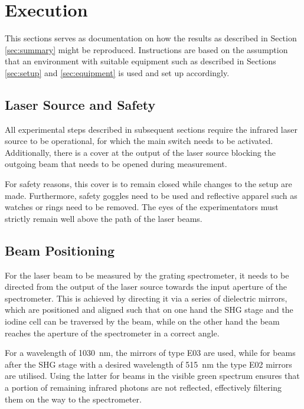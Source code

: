 \section{Execution}
\label{sec:execution}

This sections serves as documentation on how the results as described in Section \ref{sec:summary} might be reproduced. Instructions are based on the assumption that an environment with suitable equipment such as described in Sections \ref{sec:setup} and \ref{sec:equipment} is used and set up accordingly.

\subsection{Laser Source and Safety}
\label{sec:laser-source-and-safety}

All experimental steps described in subsequent sections require the infrared laser source to be operational, for which the main switch needs to be activated. Additionally, there is a cover at the output of the laser source blocking the outgoing beam that needs to be opened during measurement.

For safety reasons, this cover is to remain closed while changes to the setup are made. Furthermore, safety goggles need to be used and reflective apparel such as watches or rings need to be removed. The eyes of the experimentators must strictly remain well above the path of the laser beams.

\subsection{Beam Positioning}
\label{sec:execution:beam-positioning}

For the laser beam to be measured by the grating spectrometer, it needs to be directed from the output of the laser source towards the input aperture of the spectrometer. This is achieved by directing it via a series of dielectric mirrors, which are positioned and aligned such that on one hand the SHG stage and the iodine cell can be traversed by the beam, while on the other hand the beam reaches the aperture of the spectrometer in a correct angle.

For a wavelength of \SI{1030}{\nm}, the mirrors of type E03 are used, while for beams after the SHG stage with a desired wavelength of \SI{515}{\nm} the type E02 mirrors are utilised. Using the latter for beams in the visible green spectrum ensures that a portion of remaining infrared photons are not reflected, effectively filtering them on the way to the spectrometer.


